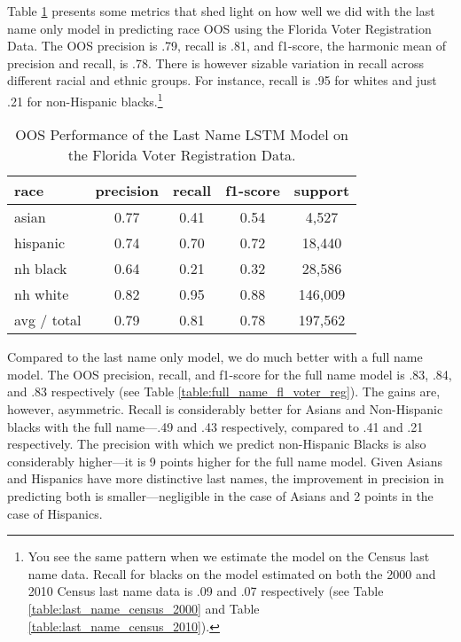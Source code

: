 \documentclass[12pt, letterpaper]{article}
\begin{document}
Table \ref{table:last_name_fl_voter_reg} presents some metrics that shed light on how well we did with the last name only model in predicting race OOS using the Florida Voter Registration Data. The OOS precision is .79, recall is .81, and f1-score, the harmonic mean of precision and recall, is .78. There is however sizable variation in recall across different racial and ethnic groups. For instance, recall is .95 for whites and just .21 for non-Hispanic blacks.\footnote{You see the same pattern when we estimate the model on the Census last name data. Recall for blacks on the model estimated on both the 2000 and 2010 Census last name data is .09 and .07 respectively (see Table \ref{table:last_name_census_2000} and Table \ref{table:last_name_census_2010}).}

\begin{table}[h!]
\centering
\caption{OOS Performance of the Last Name LSTM Model on the Florida Voter Registration Data.}
\begin{tabular}{ l c c c c }
\hline    
    race & precision & recall & f1-score & support \\
\hline
      asian &       0.77 &      0.41 &      0.54 &      4,527 \\
   hispanic &       0.74 &      0.70 &      0.72 &     18,440 \\
   nh black &       0.64 &      0.21 &      0.32 &     28,586 \\
   nh white &       0.82 &      0.95 &      0.88 &    146,009 \\

avg / total &       0.79 &      0.81 &      0.78 &    197,562 \\

\hline
\end{tabular}
\label{table:last_name_fl_voter_reg}
\end{table}

Compared to the last name only model, we do much better with a full name model. The OOS precision, recall, and f1-score for the full name model is .83, .84, and .83 respectively (see Table \ref{table:full_name_fl_voter_reg}). The gains are, however, asymmetric. Recall is considerably better for Asians and Non-Hispanic blacks with the full name---.49 and .43 respectively, compared to .41 and .21 respectively. The precision with which we predict non-Hispanic Blacks is also considerably higher---it is 9 points higher for the full name model. Given Asians and Hispanics have more distinctive last names, the improvement in precision in predicting both is smaller---negligible in the case of Asians and 2 points in the case of Hispanics.
\end{document}

